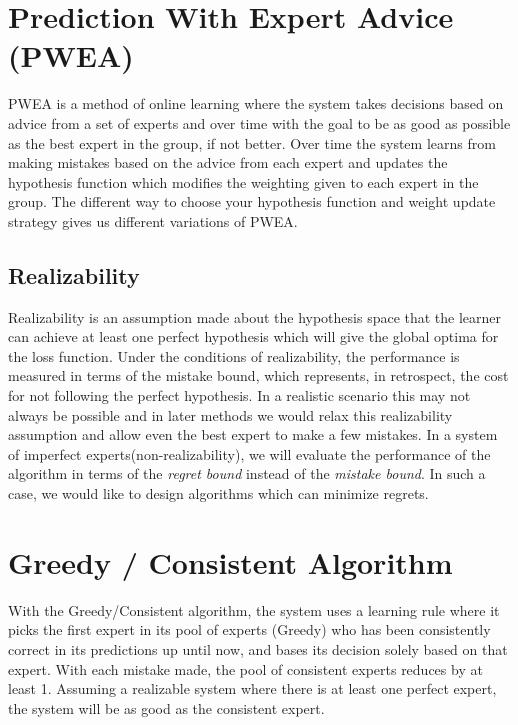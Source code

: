 \documentclass[11pt]{article}
\begin{document}
\section{Prediction With Expert Advice (PWEA)}
PWEA is a method of online learning where the system takes decisions based on advice from a set of experts and over time with the goal to be as good as possible as the best expert in the group, if not better. Over time the system learns from making mistakes based on the advice from each expert and updates the hypothesis function which modifies the weighting given to each expert in the group.  The different way to choose your hypothesis function and weight update strategy gives us different variations of PWEA.\cite{Bianchi1997Expert,Bianchi1999sequences}

\subsection{Realizability}


\normalfont
Realizability is an assumption made about the hypothesis space that the learner can achieve at least one perfect hypothesis which will give the global optima for the loss function. Under the conditions of realizability, the performance is measured in terms of the mistake bound, which represents, in retrospect, the cost for not following the perfect hypothesis. In a realistic scenario this may not always be possible and in later methods we would relax this realizability assumption and allow even the best expert to make a few mistakes. In a system of imperfect experts(non-realizability), we will evaluate the performance of the algorithm in terms of the \textit{regret bound} instead of the \textit{mistake bound}. In such a case, we would like to design algorithms which can minimize regrets.

\section{Greedy / Consistent Algorithm}
With the Greedy/Consistent algorithm, the system uses a learning rule where it picks the first expert in its pool of experts (Greedy) who has been consistently correct in its predictions up until now, and bases its decision solely based on that expert. With each mistake made, the pool of consistent experts reduces by at least 1. Assuming a realizable system where there is at least one perfect expert, the system will be as good as the consistent expert.
\end{document}
